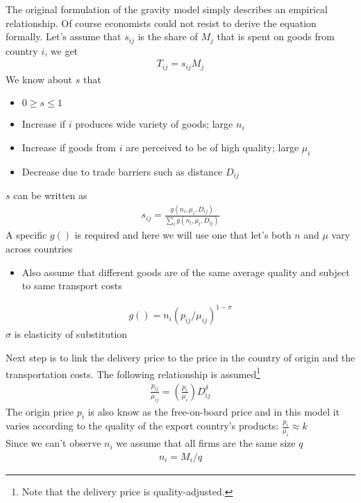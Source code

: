 \documentclass{beamer}
\begin{document}
\begin{frame}
  The original formulation of the gravity model simply describes an empirical relationship. 
  Of course economists could not resist to derive the equation formally.
  Let's assume that $s_{ij}$ is the share of $M_j$ that is spent on goods from country $i$, we get
  \begin{align*}
    T_{ij} = s_{ij}M_j
  \end{align*}
  We know about $s$ that
  \begin{itemize}
    \item $0 \geq s \leq 1 $
    \item Increase if $i$ produces wide variety of goods; large $n_i$
    \item Increase if goods from $i$ are perceived to be of high quality; large $\mu_i$
    \item Decrease due to trade barriers such as distance $D_{ij}$
  \end{itemize}
\end{frame}

\begin{frame}
  $s$ can be written as
  \begin{align*}
    s_{ij} = \frac{g(n_i,\mu_i,D_{ij})}{\sum_l g(n_l,\mu_l,D_{lj})}
  \end{align*}
  \medskip
  A specific $g()$ is required and here we will use one that let's both $n$ and $\mu$ vary across countries
  \begin{itemize}
    \item Also assume that different goods are of the same average quality and subject to same transport costs
  \end{itemize}
  \begin{align*}
    g() = n_i (p_{ij}/\mu_{ij})^{1-\sigma}
  \end{align*}
  $\sigma$ is elasticity of substitution  
\end{frame}

\begin{frame}
  Next step is to link the delivery price to the price in the country of origin and the transportation costs. 
  The following relationship is assumed\footnote{Note that the delivery price is quality-adjusted.}
  \begin{align*}
    \frac{p_{ij}}{\mu_{ij}} = \left(\frac{p_i}{\mu_i}\right)D_{ij}^\delta
  \end{align*}
  The origin price $p_i$ is also know as the free-on-board price and in this model it varies according to the quality of the export country's products: $\frac{p_{i}}{\mu_{i}} \approx k$\\  
  Since we can't observe $n_i$ we assume that all firms are the same size $q$
  \begin{align*}
    n_i=M_i/q
  \end{align*}  
\end{frame}
\end{document}
